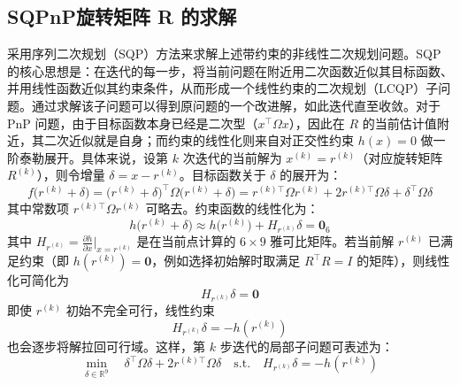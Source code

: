 \subsection{SQPnP旋转矩阵 R 的求解}
采用序列二次规划（SQP）方法来求解上述带约束的非线性二次规划问题。SQP 的核心思想是：在迭代的每一步，将当前问题在附近用二次函数近似其目标函数、并用线性函数近似其约束条件，从而形成一个线性约束的二次规划（LCQP）子问题。通过求解该子问题可以得到原问题的一个改进解，如此迭代直至收敛。对于PnP 问题，由于目标函数本身已经是二次型（$x^\top \Omega x$），因此在 $R$ 的当前估计值附近，其二次近似就是自身；而约束的线性化则来自对正交性约束 $h(x)=0$ 做一阶泰勒展开。具体来说，设第 $k$ 次迭代的当前解为 $x^{(k)} = r^{(k)}$（对应旋转矩阵 $R^{(k)}$），则令增量 $\delta = x - r^{(k)}$。目标函数关于 $\delta$ 的展开为：
\begin{equation}
	f\bigl(r^{(k)} + \delta\bigr)
	= \bigl(r^{(k)} + \delta\bigr)^{\top} \Omega \bigl(r^{(k)} + \delta\bigr)
	= r^{(k)\top}\Omega r^{(k)}  +  2 r^{(k)\top}\Omega \delta  +  \delta^\top\Omega \delta
\end{equation}
其中常数项 $r^{(k)\top}\Omega r^{(k)}$ 可略去。约束函数的线性化为：
\begin{equation}
	h\bigl(r^{(k)} + \delta\bigr)
	\approx 
	h\bigl(r^{(k)}\bigr)
	+ 
	H_{r^{(k)}} \delta
	= 
	\mathbf{0}_6
\end{equation}
其中 $H_{r^{(k)}} = \frac{\partial h}{\partial x}\big|_{x=r^{(k)}}$ 是在当前点计算的 $6\times 9$ 雅可比矩阵。若当前解 $r^{(k)}$ 已满足约束（即 $h(r^{(k)})=\mathbf{0}$，例如选择初始解时取满足 $R^\top R=I$ 的矩阵），则线性化可简化为
\begin{equation}
	H_{r^{(k)}} \delta  =  \mathbf{0}
\end{equation}
即使 $r^{(k)}$ 初始不完全可行，线性约束
\begin{equation}
	H_{r^{(k)}} \delta 
	=  
	- h(r^{(k)})
\end{equation}
也会逐步将解拉回可行域。这样，第 $k$ 步迭代的局部子问题可表述为：
\begin{equation}
	\min_{\delta \in \mathbb{R}^9} 
	\quad 
	\delta^\top \Omega  \delta 
	+  2 r^{(k)\top} \Omega  \delta
	\quad 
	\text{s.t.} 
	\quad 
	H_{r^{(k)}} \delta 
	=  
	- h(r^{(k)})
\end{equation}

